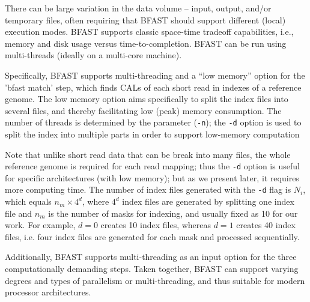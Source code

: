 \documentclass{sig-alternate}
\begin{document}
There can be large variation in the data volume -- input, output,
and/or temporary files, often requiring that BFAST should support
different (local) execution modes.  BFAST supports classic space-time
tradeoff capabilities, i.e., memory and disk usage versus
time-to-completion. BFAST can be run using multi-threads (ideally
on a multi-core machine).

Specifically, BFAST supports multi-threading and a ``low memory''
option for the 'bfast match' step, which finds CALs of each short read in
indexes of a reference genome.  The low memory option aims specifically to
split the index files into several files, and thereby facilitating low
(peak) memory consumption.  The number of threads is determined by the
parameter (\texttt{-n}); the \texttt{-d} option is used to split the
index into multiple parts in order to support low-memory computation


Note that unlike short read data that can be break into many files, the whole reference genome is required for each read mapping;
thus the \texttt{-d} option is useful for specific architectures (with
low memory); but as we present later, it requires more computing time.  The number of index files
generated with the \texttt{-d} flag is $N_i$, which equals $n_m \times
4^d$, where $4^d$ index files are generated by splitting one index file and
$n_m$ is the number of masks for indexing, and usually fixed as 10 for
our work.  For example, $d=0$ creates 10 index files, whereas $d=1$
creates 40 index files, i.e. four index files are generated for each mask
and processed sequentially.  

Additionally, BFAST supports multi-threading as an input option for
the three computationally demanding steps.  Taken together, BFAST can
support varying degrees and types of parallelism or multi-threading,
and thus suitable for modern processor architectures.
\end{document}
